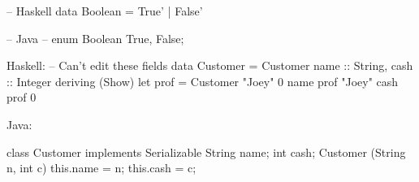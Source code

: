 
-- Haskell
data Boolean = True' | False'

-- Java
-- enum Boolean {True, False};

Haskell: -- Can't edit these fields
data Customer = Customer {name :: String, cash :: Integer} deriving (Show)
let prof = Customer "Joey" 0
name prof
"Joey"
cash prof 
0

Java:

class Customer implements Serializable {
String name;
int cash;
Customer (String n, int c)
	{
		this.name = n;
		this.cash = c;
	}
										}
